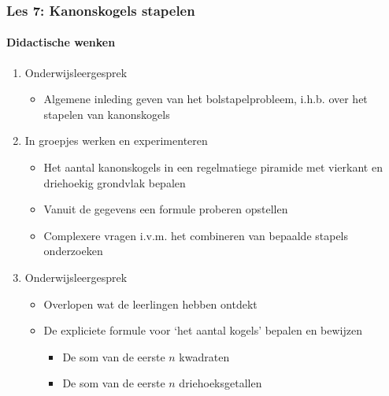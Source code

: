\documentclass[dutch]{beamer}
\begin{document}
\begin{frame}
\frametitle{Les 7: Kanonskogels stapelen}
\framesubtitle{Didactische wenken}
\begin{enumerate}
	\item Onderwijsleergesprek
	\begin{itemize}
	\item Algemene inleding geven van het bolstapelprobleem, i.h.b. over het stapelen van kanonskogels	
\end{itemize}
  \item In groepjes werken en experimenteren
  \begin{itemize}
	\item Het aantal kanonskogels in een regelmatiege piramide met vierkant en driehoekig grondvlak bepalen
	\item Vanuit de gegevens een formule proberen opstellen
	\item Complexere vragen i.v.m. het combineren van bepaalde stapels onderzoeken
\end{itemize}
  \item Onderwijsleergesprek
  \begin{itemize}
	  \item Overlopen wat de leerlingen hebben ontdekt
	  \item De expliciete formule voor \textquoteleft het aantal kogels' bepalen en bewijzen
	  \begin{itemize}
	\item De som van de eerste $n$ kwadraten
	\item De som van de eerste $n$ driehoeksgetallen
\end{itemize}
  \end{itemize}
  
\end{enumerate}

\end{frame}

\end{document}
